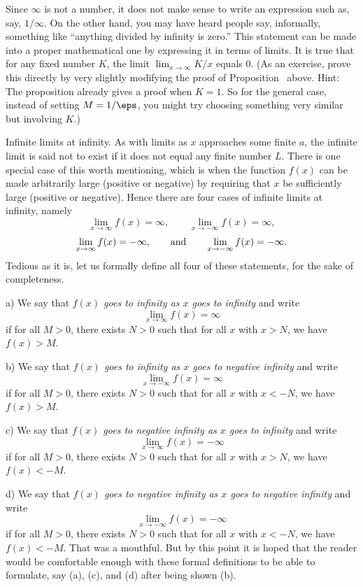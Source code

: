 Since $\infty$ is not a number, it does not make sense to write an expression such as, say, $1/\infty$.
On the other hand, you may have heard people say, informally, something like ``anything divided by infinity
is zero.'' This statement can be made into a proper mathematical one by expressing it in terms of limits.
It is true that for any fixed number $K$, the limit $\lim_{x\to \infty} K/x$ equals $0$. (As an exercise,
prove this directly by very slightly modifying the proof of Proposition~{\prophorasymp} above.
Hint: The proposition already gives a proof when $K=1$. So for the general case, instead of setting
$M = 1/\eps$, you might try choosing something very similar but involving $K$.)

\medskip\boldlabel Infinite limits at infinity.
As with limits as $x$ approaches some finite $a$, the infinite limit is said not to exist if it does
not equal any finite number $L$. There is one special case of this worth mentioning, which is when
the function $f(x)$ can be made arbitrarily large (positive or negative) by requiring that $x$
be sufficiently large (positive or negative). Hence there are four cases of infinite limits at infinity,
namely
$$\lim_{x\to \infty} f(x) = \infty,\qquad
\lim_{x\to -\infty} f(x) = \infty,$$
$$\lim_{x\to \infty} f(x) = -\infty,\qquad\hbox{and}\qquad
\lim_{x\to -\infty} f(x) = -\infty.$$
Tedious as it is, let us formally define all four of these statements, for the sake of completeness.
\medskip
\item{a)}
We say that {\it $f(x)$ goes to infinity as $x$ goes to infinity} and write
$$\lim_{x\to\infty} f(x) = \infty$$
if for all $M>0$, there exists $N>0$ such
that for all $x$ with $x > N$, we have $f(x) > M$.
\smallskip
\item{b)}
We say that {\it $f(x)$ goes to infinity as $x$ goes to negative infinity} and
write
$$\lim_{x\to-\infty} f(x) = \infty$$
if for all $M>0$, there exists $N>0$ such
that for all $x$ with $x < -N$, we have $f(x) > M$.
\smallskip
\item{c)}
We say that {\it $f(x)$ goes to negative infinity as $x$ goes to infinity} and
write
$$\lim_{x\to\infty} f(x) = -\infty$$
if for all $M>0$, there exists $N>0$ such
that for all $x$ with $x > N$, we have $f(x) < -M$.
\smallskip
\item{d)}
We say that {\it $f(x)$ goes to negative infinity as $x$ goes to negative infinity} and
write
$$\lim_{x\to-\infty} f(x) = -\infty$$
if for all $M>0$, there exists $N>0$ such
that for all $x$ with $x < -N$, we have $f(x) < -M$.
\medskip\noindent
That was a mouthful. But by this point it is hoped that the reader would be comfortable enough with these
formal definitions to be able to formulate, say (a), (c), and (d) after being shown (b).

